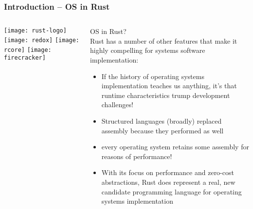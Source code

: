 \begin{frame}[plain]
	\frametitle{Introduction -- OS in Rust}
	
	
	
	\begin{columns}
		
		\begin{column}{.2\textwidth}
			
			\texttt{[image: rust-logo]}
			\texttt{[image: redox]}
			\texttt{[image: rcore]}
			\texttt{[image: firecracker]}
		\end{column}
		
		\begin{column}{.8\textwidth}
			
			OS in Rust? \\
			Rust has a number of other features that make it highly
			compelling for systems software implementation:
			
			\begin{itemize}
				
				\item  If the history of operating systems implementation teaches us
				anything, it’s that runtime characteristics trump development
				challenges!
				
				\item  Structured languages (broadly) replaced assembly because
				they performed as well
				
				\item every operating system retains some assembly for reasons
				of performance!
						
				\item With its focus on performance and zero-cost abstractions, Rust
				does represent a real, new candidate programming language
				for operating systems implementation

			\end{itemize}
			
		\end{column}
		
		
	\end{columns}
	
	
\end{frame}



